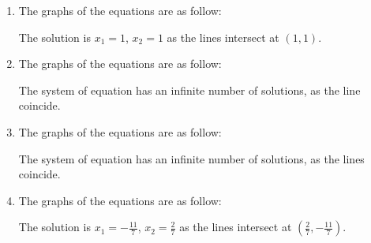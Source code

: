 \documentclass[../../../../Assignments]{subfiles}
\begin{document}
\begin{solution}
    \begin{enumerate}[label = \alph*)]
        \item The graphs of the equations are as follow:
            \begin{figure}[H]
                \centering
                \begingroup
                    
                \endgroup
            \end{figure}

            The solution is \(x_1 = 1\), \(x_2 = 1\) as the lines intersect at
            \((1, 1)\).

        \item The graphs of the equations are as follow:
            \begin{figure}[H]
                \centering
                \begingroup
                    
                \endgroup
            \end{figure}

            The system of equation has an infinite number of solutions, as the
            line coincide.

        \item The graphs of the equations are as follow:
            \begin{figure}[H]
                \centering
                \begingroup
                    
                \endgroup
            \end{figure}

            The system of equation has an infinite number of solutions, as the
            lines coincide.

        \item The graphs of the equations are as follow:
            \begin{figure}[H]
                \centering
                \begingroup
                    
                \endgroup
            \end{figure}

            The solution is \(x_1 = -\frac{11}{7}\), \(x_2 = \frac{2}{7}\) as
            the lines intersect at \((\frac{2}{7}, -\frac{11}{7})\).
    \end{enumerate}
\end{solution}
\end{document}
